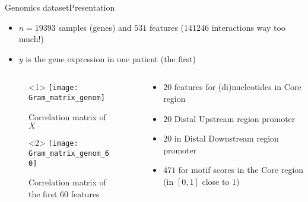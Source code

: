 \documentclass[10pt,aspectratio=43]{beamer}
\begin{document}
\begin{frame}{Genomics dataset}{Presentation \citep{Bessiere_Taha_Petitprez_Vandel_Marin_Brehelin_Lebre_Lecellier}}
\begin{itemize}
    \item $n=19393$ samples (genes) and $531$ features ($141246$ interactions
    \ie way too much!)
    \item $y$ is the gene expression in one patient (the first)
\end{itemize}

\begin{columns}
\begin{column}{.5\textwidth}
    \begin{figure}
        \centering
    \begin{onlyenv}<1>
        \texttt{[image: Gram\_matrix\_genom]}
        \caption*{Correlation matrix of $X$}
    \end{onlyenv}
    \begin{onlyenv}<2>
        \texttt{[image: Gram\_matrix\_genom\_60]}
        \caption*{Correlation matrix of the first $60$ features}
    \end{onlyenv}
    \end{figure}
\end{column}
\begin{column}{.6\textwidth}
    \begin{itemize}
        \item $20$ features for (di)nucleotides in Core region
        \item $20$ Distal Upstream region promoter
        \item $20$ in Distal Downstream region promoter
        \item $471$ for motif scores in the Core region (in $[0,1]$
        close to $1$)
    \end{itemize}
\end{column}
\end{columns}
\end{frame}
\end{document}
